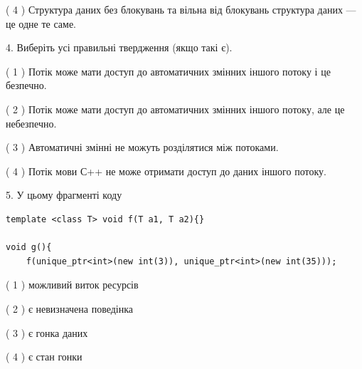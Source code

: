 \documentclass[12pt, ukrainian]{article}
\begin{document}
\begin {large}
{( 4 ) Структура даних без блокувань та вільна від блокувань структура даних --- це одне те саме.%


4. Виберіть усі правильні твердження (якщо такі є).\par
\vspace{2mm}

( 1 ) Потік може мати доступ до автоматичних змінних іншого потоку і це безпечно.%

( 2 ) Потік може мати доступ до автоматичних змінних іншого потоку, але це небезпечно.%

( 3 ) Автоматичні змінні не можуть розділятися між потоками.%

( 4 ) Потік мови С++ не може отримати доступ до даних іншого потоку.%


5. У цьому фрагменті коду
\begin{verbatim}
template <class T> void f(T a1, T a2){}

void g(){
    f(unique_ptr<int>(new int(3)), unique_ptr<int>(new int(35)));
\end{verbatim}

( 1 ) можливий виток ресурсів%

( 2 ) є невизначена поведінка%

( 3 ) є гонка даних%

( 4 ) є стан гонки%
}
\end {large}
\end{document}
